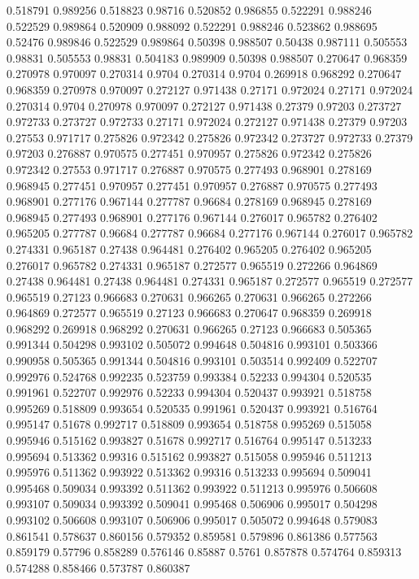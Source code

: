 0.518791 0.989256
0.518823 0.98716
0.520852 0.986855
0.522291 0.988246
0.522529 0.989864
0.520909 0.988092
0.522291 0.988246
0.523862 0.988695
0.52476 0.989846
0.522529 0.989864
0.50398 0.988507
0.50438 0.987111
0.505553 0.98831
0.505553 0.98831
0.504183 0.989909
0.50398 0.988507
0.270647 0.968359
0.270978 0.970097
0.270314 0.9704
0.270314 0.9704
0.269918 0.968292
0.270647 0.968359
0.270978 0.970097
0.272127 0.971438
0.27171 0.972024
0.27171 0.972024
0.270314 0.9704
0.270978 0.970097
0.272127 0.971438
0.27379 0.97203
0.273727 0.972733
0.273727 0.972733
0.27171 0.972024
0.272127 0.971438
0.27379 0.97203
0.27553 0.971717
0.275826 0.972342
0.275826 0.972342
0.273727 0.972733
0.27379 0.97203
0.276887 0.970575
0.277451 0.970957
0.275826 0.972342
0.275826 0.972342
0.27553 0.971717
0.276887 0.970575
0.277493 0.968901
0.278169 0.968945
0.277451 0.970957
0.277451 0.970957
0.276887 0.970575
0.277493 0.968901
0.277176 0.967144
0.277787 0.96684
0.278169 0.968945
0.278169 0.968945
0.277493 0.968901
0.277176 0.967144
0.276017 0.965782
0.276402 0.965205
0.277787 0.96684
0.277787 0.96684
0.277176 0.967144
0.276017 0.965782
0.274331 0.965187
0.27438 0.964481
0.276402 0.965205
0.276402 0.965205
0.276017 0.965782
0.274331 0.965187
0.272577 0.965519
0.272266 0.964869
0.27438 0.964481
0.27438 0.964481
0.274331 0.965187
0.272577 0.965519
0.272577 0.965519
0.27123 0.966683
0.270631 0.966265
0.270631 0.966265
0.272266 0.964869
0.272577 0.965519
0.27123 0.966683
0.270647 0.968359
0.269918 0.968292
0.269918 0.968292
0.270631 0.966265
0.27123 0.966683
0.505365 0.991344
0.504298 0.993102
0.505072 0.994648
0.504816 0.993101
0.503366 0.990958
0.505365 0.991344
0.504816 0.993101
0.503514 0.992409
0.522707 0.992976
0.524768 0.992235
0.523759 0.993384
0.52233 0.994304
0.520535 0.991961
0.522707 0.992976
0.52233 0.994304
0.520437 0.993921
0.518758 0.995269
0.518809 0.993654
0.520535 0.991961
0.520437 0.993921
0.516764 0.995147
0.51678 0.992717
0.518809 0.993654
0.518758 0.995269
0.515058 0.995946
0.515162 0.993827
0.51678 0.992717
0.516764 0.995147
0.513233 0.995694
0.513362 0.99316
0.515162 0.993827
0.515058 0.995946
0.511213 0.995976
0.511362 0.993922
0.513362 0.99316
0.513233 0.995694
0.509041 0.995468
0.509034 0.993392
0.511362 0.993922
0.511213 0.995976
0.506608 0.993107
0.509034 0.993392
0.509041 0.995468
0.506906 0.995017
0.504298 0.993102
0.506608 0.993107
0.506906 0.995017
0.505072 0.994648
0.579083 0.861541
0.578637 0.860156
0.579352 0.859581
0.579896 0.861386
0.577563 0.859179
0.57796 0.858289
0.576146 0.85887
0.5761 0.857878
0.574764 0.859313
0.574288 0.858466
0.573787 0.860387
